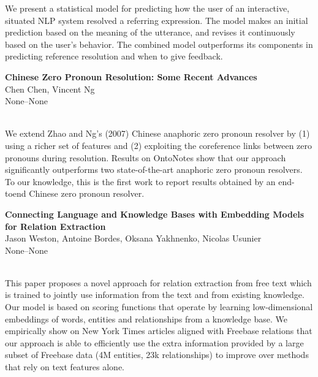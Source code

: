 \documentclass[twoside,makeidx]{book}
\begin{document}
\nopagebreak%
\noindent%
{\small We present a statistical model for predicting how the user of an interactive, situated NLP system resolved a referring expression. The model makes an initial prediction based on the meaning of the utterance, and revises it continuously based on the user's behavior. The combined model outperforms its components in predicting reference resolution and when to give feedback.}
\par\vspace{2em}\noindent%
\begin{minipage}{\linewidth}%
\begin{center}
\textbf{\normalsize Chinese Zero Pronoun Resolution: Some Recent Advances}\\
\normalsize  Chen Chen,  Vincent Ng\\
{\small None--None}\\
\end{center}
\end{minipage}\\[0.5em]
\nopagebreak%
\noindent%
{\small We extend Zhao and Ng's (2007) Chinese anaphoric zero pronoun resolver by (1) using a richer set of features and (2) exploiting the coreference links between zero pronouns during resolution. Results on OntoNotes show that our approach significantly outperforms two state-of-the-art anaphoric zero pronoun resolvers. To our knowledge, this is the first work to report results obtained by an end-toend Chinese zero pronoun resolver.}
\par\vspace{2em}\noindent%
\begin{minipage}{\linewidth}%
\begin{center}
\textbf{\normalsize Connecting Language and Knowledge Bases with Embedding Models for Relation Extraction}\\
\normalsize  Jason Weston,  Antoine Bordes,  Oksana Yakhnenko,  Nicolas Usunier\\
{\small None--None}\\
\end{center}
\end{minipage}\\[0.5em]
\nopagebreak%
\noindent%
{\small This paper proposes a novel approach for relation extraction from free text which is trained to jointly use information from the text and from existing knowledge. Our model is based on scoring functions that operate by learning low-dimensional embeddings of words, entities and  relationships from a knowledge base. We empirically show on New York Times articles aligned with Freebase relations that our approach is able to efficiently use the extra information provided by a large subset of Freebase data (4M entities, 23k relationships) to improve over methods that rely on text features alone.}
\end{document}
